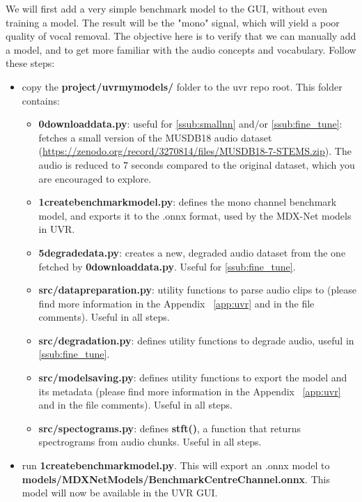 \documentclass[
10pt, %
a4paper, %
oneside, %
headinclude,footinclude, %
BCOR5mm, %
]{scrartcl}
\begin{document}
We will first add a very simple benchmark model to the GUI, without even training a model. The result will be the "mono" signal, which will yield a poor quality of vocal removal. The objective here is to verify that we can manually add a model, and to get more familiar with the audio concepts and vocabulary. Follow these steps:
\begin{itemize}
    \item copy the \textbf{project/uvr\textunderscore my\textunderscore models/} folder to the uvr repo root. This folder contains:
        \begin{itemize}
            \item \textbf{0\textunderscore download\textunderscore data.py}: useful for \ref{ssub:smallnn} and/or \ref{ssub:fine_tune}: fetches a small version of the MUSDB18 audio dataset (\url{https://zenodo.org/record/3270814/files/MUSDB18-7-STEMS.zip}). The audio is reduced to $7$ seconds compared to the original dataset, which you are encouraged to explore.
            \item \textbf{1\textunderscore create\textunderscore benchmark\textunderscore model.py}: defines the mono channel benchmark model, and exports it to the .onnx format, used by the MDX-Net models in UVR.
            \item \textbf{5\textunderscore degrade\textunderscore data.py}: creates a new, degraded audio dataset from the one fetched by \textbf{0\textunderscore download\textunderscore data.py}. Useful for \ref{ssub:fine_tune}.
            \item \textbf{src/data\textunderscore preparation.py}: utility functions to parse audio clips to  (please find more information in the Appendix ~\ref{app:uvr} and in the file comments). Useful in all steps.
            \item \textbf{src/degradation.py}: defines utility functions to degrade audio, useful in \ref{ssub:fine_tune}.
            \item \textbf{src/model\textunderscore saving.py}: defines utility functions to export the model and its metadata (please find more information in the Appendix ~\ref{app:uvr} and in the file comments). Useful in all steps.
            \item \textbf{src/spectograms.py}: defines \textbf{stft()}, a function that returns spectrograms from audio chunks. Useful in all steps.
        \end{itemize}
    
    \item run \textbf{1\textunderscore create\textunderscore benchmark\textunderscore model.py}. This will export an .onnx model to \textbf{models/MDX\textunderscore Net\textunderscore Models/Benchmark\textunderscore CentreChannel.onnx}. This model will now be available in the UVR GUI.
\end{itemize}
\end{document}
